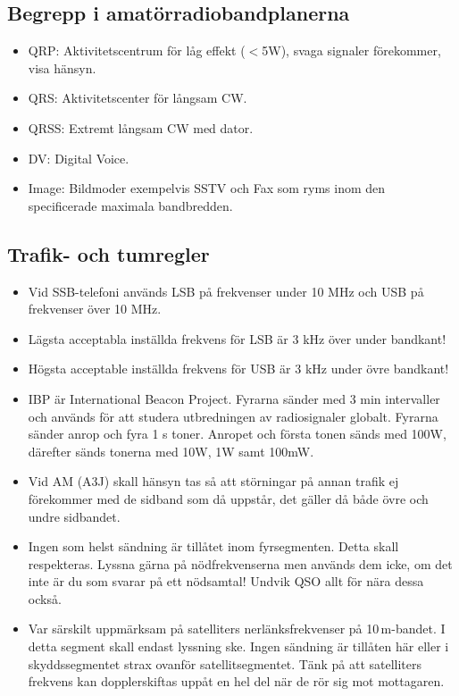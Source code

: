 \clearpage

\subsection{Begrepp i amatörradiobandplanerna}

\begin{itemize}
\item QRP: Aktivitetscentrum för låg effekt ($<$5W), svaga signaler
      förekommer, visa hänsyn.
\item QRS: Aktivitetscenter för långsam CW.
\item QRSS: Extremt långsam CW med dator.
\item DV: Digital Voice.
\item Image: Bildmoder exempelvis SSTV och Fax som ryms inom den specificerade
	  maximala bandbredden.
\end{itemize}

\subsection{Trafik- och tumregler}

\begin{itemize}
\item Vid SSB-telefoni används LSB på frekvenser under 10 MHz och USB
      på frekvenser över 10 MHz.
\item Lägsta acceptabla inställda frekvens för LSB är 3 kHz över
      under bandkant!
\item Högsta acceptable inställda frekvens för USB är 3 kHz under
      övre bandkant!
\item IBP är International Beacon Project. Fyrarna sänder med 3 min
      intervaller och används för att studera utbredningen av
      radiosignaler globalt. Fyrarna sänder anrop och fyra 1 s toner.
      Anropet och första tonen sänds med 100W, därefter sänds tonerna
      med 10W, 1W samt 100mW.
\item Vid AM (A3J) skall hänsyn tas så att störningar på annan trafik ej fö\-re\-kom\-mer
      med de sidband som då uppstår, det gäller då både övre och undre
      sidbandet.
\item Ingen som helst sändning är tillåtet inom fyrsegmenten. Detta skall respekteras.
      Lyssna gärna på nödfrekvenserna men används dem icke, om det
      inte är du som svarar på ett nödsamtal! Undvik QSO allt för nära
      dessa också.
\item Var särskilt uppmärksam på satelliters nerlänksfrekvenser på 10\,m-bandet.
      I detta segment skall endast lyssning ske. Ingen sändning är
      tillåten här eller i skyddssegmentet strax ovanför
      satellitsegmentet. Tänk på att satelliters frekvens kan
      dopplerskiftas uppåt en hel del när de rör sig mot mottagaren.
\end{itemize}

